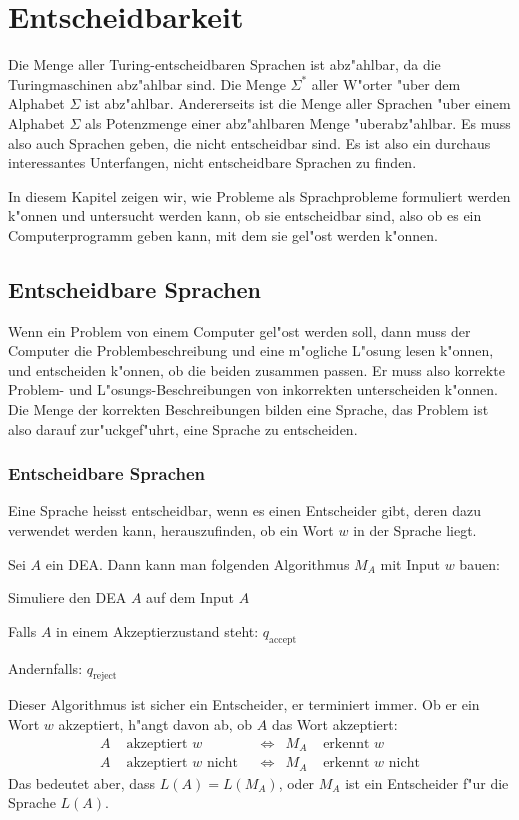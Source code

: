 % 
%
\chapter{Entscheidbarkeit\label{chapter-entscheidbarkeit}}
\rhead{}
Die Menge aller Turing-entscheidbaren Sprachen ist abz"ahlbar,
da die Turingmaschinen abz"ahlbar sind.
Die Menge $\Sigma^*$ aller W"orter "uber dem Alphabet $\Sigma$ ist abz"ahlbar.
Andererseits ist die Menge aller Sprachen "uber einem Alphabet $\Sigma$
als Potenzmenge einer abz"ahlbaren Menge "uberabz"ahlbar. Es muss
also auch Sprachen geben, die nicht entscheidbar sind. Es ist also
ein durchaus interessantes Unterfangen, nicht entscheidbare Sprachen
zu finden.

In diesem Kapitel zeigen wir, wie Probleme als Sprachprobleme
formuliert werden k"onnen und untersucht werden kann, ob sie entscheidbar sind,
also ob es ein Computerprogramm geben kann, mit dem sie gel"ost werden
k"onnen.

\section{Entscheidbare Sprachen}
Wenn ein Problem von einem Computer gel"ost werden soll, dann
muss der Computer die Problembeschreibung und eine m"ogliche L"osung
lesen k"onnen, und entscheiden k"onnen, ob die beiden zusammen passen.
Er muss also korrekte Problem- und L"osungs-Beschreibungen von
inkorrekten unterscheiden k"onnen. Die Menge der korrekten
Beschreibungen bilden eine Sprache, das Problem ist also darauf
zur"uckgef"uhrt, eine Sprache zu entscheiden.

\subsection{Entscheidbare Sprachen}
Eine Sprache heisst entscheidbar, wenn es einen Entscheider gibt, deren
dazu verwendet werden kann, herauszufinden, ob ein Wort $w$ in der Sprache
liegt. 

\begin{beispiel}
Sei $A$ ein DEA. Dann kann man folgenden Algorithmus $M_A$ mit Input $w$ bauen:
\begin{compactenum}
\item Simuliere den DEA $A$ auf dem Input $A$
\item Falls $A$ in einem Akzeptierzustand steht: $q_{\text{accept}}$
\item Andernfalls: $q_{\text{reject}}$
\end{compactenum}
Dieser Algorithmus ist sicher ein Entscheider, er terminiert immer.
Ob er ein Wort $w$ akzeptiert, h"angt davon ab, ob $A$ das Wort akzeptiert:
\begin{align*}
  A&\text{ akzeptiert $w$}&
   &\Leftrightarrow&
M_A&\text{ erkennt $w$}
\\
  A&\text{ akzeptiert $w$ nicht}&
   &\Leftrightarrow&
M_A&\text{ erkennt $w$ nicht}
\end{align*}
Das bedeutet aber, dass $L(A)=L(M_A)$, oder $M_A$ ist ein Entscheider f"ur
die Sprache $L(A)$.
\end{beispiel}


